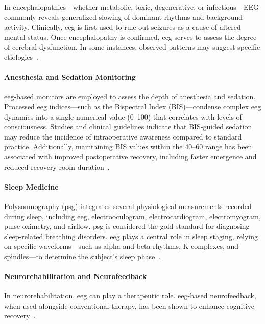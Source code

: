 In encephalopathies—whether metabolic, toxic, degenerative, or infectious—EEG commonly reveals generalized slowing of dominant rhythms and background activity. Clinically, \gls{eeg} is first used to rule out seizures as a cause of altered mental status. Once encephalopathy is confirmed, \gls{eeg} serves to assess the degree of cerebral dysfunction. In some instances, observed patterns may suggest specific etiologies~\cite{rayi-2024}.

\paragraph*{Anesthesia and Sedation Monitoring}
\gls{eeg}-based monitors are employed to assess the depth of anesthesia and sedation. Processed \gls{eeg} indices—such as the Bispectral Index (BIS)—condense complex \gls{eeg} dynamics into a single numerical value (0–100) that correlates with levels of consciousness. Studies and clinical guidelines indicate that BIS-guided sedation may reduce the incidence of intraoperative awareness compared to standard practice. Additionally, maintaining BIS values within the 40–60 range has been associated with improved postoperative recovery, including faster emergence and reduced recovery-room duration~\cite{mathur-2023}.


\paragraph*{Sleep Medicine}
Polysomnography (\gls{psg}) integrates several physiological measurements recorded during sleep, including \gls{eeg}, electrooculogram, electrocardiogram, electromyogram, pulse oximetry, and airflow. \gls{psg} is considered the gold standard for diagnosing sleep-related breathing disorders. \gls{eeg} plays a central role in sleep staging, relying on specific waveforms—such as alpha and beta rhythms, K-complexes, and spindles—to determine the subject’s sleep phase~\cite{gerstenslager-2023,rundo-2019}.


\paragraph*{Neurorehabilitation and Neurofeedback}
In neurorehabilitation, \gls{eeg} can play a therapeutic role. \gls{eeg}-based neurofeedback, when used alongside conventional therapy, has been shown to enhance cognitive recovery~\cite{arroyo-ferrer-2021}.


